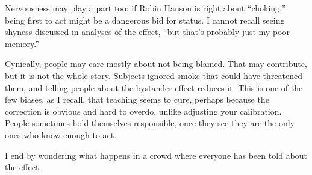 Nervousness may play a part too: if Robin Hanson is right about ``choking,'' being first to act might be a dangerous bid for status. I cannot recall seeing shyness discussed in analyses of the effect, ``but that's probably just my poor memory.'' 

Cynically, people may care mostly about not being blamed. That may contribute, but it is not the whole story. Subjects ignored smoke that could have threatened them, and telling people about the bystander effect reduces it.  This is one of the few biases, as I recall, that teaching seems to cure, perhaps because the correction is obvious and hard to overdo, unlike adjusting your calibration. People sometimes hold themselves responsible, once they see they are the only ones who know enough to act. 

I end by wondering what happens in a crowd where everyone has been told about the effect.
